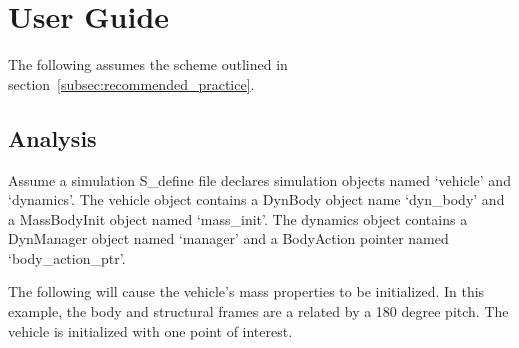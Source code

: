 %

\chapter{User Guide}\label{ch:\modelpartid:user}
The following assumes the scheme outlined in
section~\ref{subsec:recommended_practice}.

\section{Analysis}

Assume a simulation S\_define file declares simulation objects
named `vehicle' and `dynamics'. The vehicle object contains
a DynBody object name `dyn\_body' and
a MassBodyInit object named `mass\_init'. The dynamics object
contains a DynManager object named `manager' and a BodyAction pointer
named `body\_action\_ptr'.

The following will cause the vehicle's mass properties to be initialized.
In this example, the body and structural frames are a related by a 180
degree pitch. The vehicle is initialized with one point of interest.

